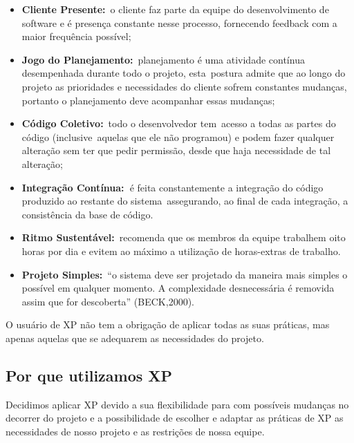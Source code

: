 \liststyleLFOii
\begin{itemize}
\item {
\textrm{\textbf{Cliente Presente:}}\textrm{\ o cliente faz parte da equipe do desenvolvimento de software e \'e
presen\c{c}a constante nesse processo, fornecendo feedback com a maior frequ\^encia poss\'ivel;}}
\item {
\textrm{\textbf{Jogo do Planejamento:}}\textrm{\ planejamento \'e uma atividade cont\'inua desempenhada durante todo o
projeto, esta\ postura admite que ao longo do projeto as prioridades e necessidades do cliente sofrem constantes
mudan\c{c}as, portanto o planejamento deve acompanhar essas mudan\c{c}as;}}
\item {
\textrm{\textbf{C\'odigo Coletivo:}}\textrm{\ todo o desenvolvedor tem\ acesso a todas as partes do c\'odigo
(inclusive\ aquelas que ele n\~ao programou) e podem fazer qualquer altera\c{c}\~ao sem ter que pedir permiss\~ao,
desde que haja necessidade de tal altera\c{c}\~ao;}}
\item {
\textrm{\textbf{Integra\c{c}\~ao Cont\'inua:\ }}\textrm{\'e feita constantemente a integra\c{c}\~ao do c\'odigo
produzido ao restante do sistema\ assegurando, ao final de cada integra\c{c}\~ao, a consist\^encia da base de
c\'odigo.}}
\item {
\textrm{\textbf{Ritmo Sustent\'avel:}}\textrm{\ recomenda que os membros da equipe trabalhem oito horas por dia e evitem
ao m\'aximo a utiliza\c{c}\~ao de horas-extras de trabalho.}}
\item {
\textrm{\textbf{Projeto Simples:}}\textrm{\ {}``o sistema deve ser projetado da maneira mais simples o poss\'ivel em
qualquer momento. A complexidade desnecess\'aria \'e removida assim que for descoberta'' (BECK,2000).}}
\end{itemize}
{
O usu\'ario de XP n\~ao tem a obriga\c{c}\~ao de aplicar todas as suas pr\'aticas, mas apenas aquelas que se adequarem
as necessidades do projeto.}


\bigskip

\subsection[Por que utilizamos XP]{ Por que utilizamos XP}

\bigskip

{
Decidimos aplicar XP devido a sua flexibilidade para com poss\'iveis mudan\c{c}as no decorrer do projeto e a
possibilidade de escolher e adaptar as pr\'aticas de XP as necessidades de nosso projeto e as restri\c{c}\~oes de nossa
equipe.}

